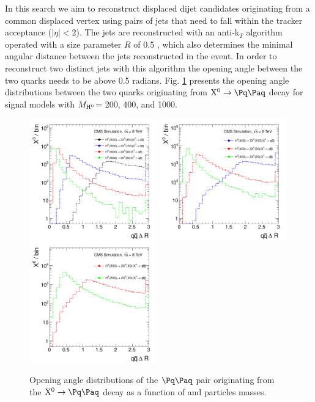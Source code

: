 In this search we aim to reconstruct displaced dijet candidates originating from a common displaced
vertex using pairs of 
 jets that need to fall 
within the tracker acceptance ($|\eta|<2$).  
 The jets are reconstructed with an anti-k$_T$
algorithm operated with a size parameter $R$ of 0.5 \cite{Cacciari:2008gp}, which also determines
the minimal angular distance between the jets reconstructed in the event. 
In order to reconstruct two distinct
jets with this algorithm the opening angle between the two quarks needs to be above 0.5 radians.
Fig. \ref{fig:sigdR} presents the opening angle distributions between the two quarks originating
from $\X \to \qq $ decay for signal models with 
$M_{\mathrm{H}^{0}}$= 200, 400, and 1000\GeV.  

\begin{figure}[htbp]
\centering
\includegraphics[width=0.49\textwidth]{plots/signal/dRH1000.pdf}
\includegraphics[width=0.49\textwidth]{plots/signal/dRH400.pdf}
\includegraphics[width=0.49\textwidth]{plots/signal/dRH200.pdf}
\caption{Opening angle distributions of the $\qq$ pair originating from the $\X \to \qq$ decay as a function
of \Higgs and \X particles masses. \label{fig:sigdR}}
\end{figure}

